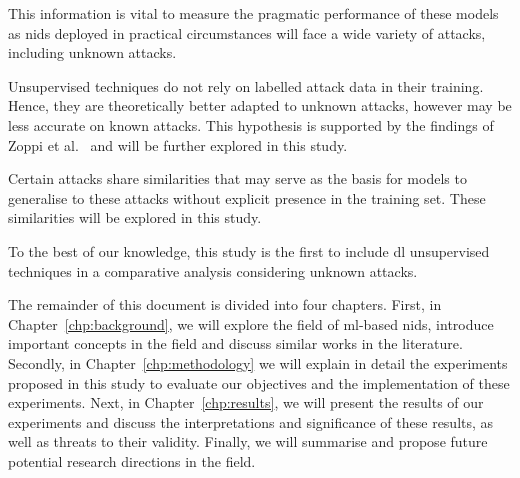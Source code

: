 This information is vital to measure the pragmatic performance of these models
as \gls{nids} deployed in practical circumstances will face a wide variety of
attacks, including unknown attacks.


\begin{center}
\end{center}

Unsupervised techniques do not rely on labelled attack data in their training.
Hence, they are theoretically better adapted to unknown attacks, however may be
less accurate on known attacks. This hypothesis is supported by the findings of
Zoppi et al.~\cite{Zoppi} and will be further explored in this study.

\begin{center}
\end{center}

Certain attacks share similarities that may serve as the basis for models to
generalise to these attacks without explicit presence in the training set.
These similarities will be explored in this study.

To the best of our knowledge, this study is the first to include \gls{dl}
unsupervised techniques in a comparative analysis considering unknown attacks.

The remainder of this document is divided into four chapters. First, in
Chapter~\ref{chp:background}, we will explore the field of \gls{ml}-based
\gls{nids}, introduce important concepts in the field and discuss similar works
in the literature. Secondly, in Chapter~\ref{chp:methodology} we will explain
in detail the experiments proposed in this study to evaluate our objectives and
the implementation of these experiments. Next, in Chapter~\ref{chp:results}, we
will present the results of our experiments and discuss the interpretations and
significance of these results, as well as threats to their validity. Finally,
we will summarise and propose future potential research directions in the
field.